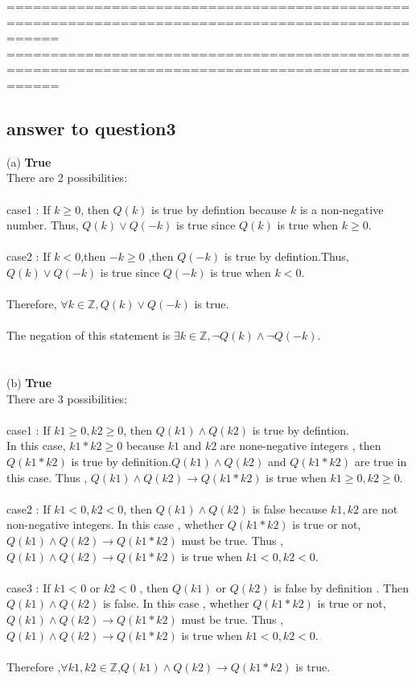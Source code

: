 \documentclass[12pt,a4paper]{article}
\begin{document}
==================================================================================================
\newpage
==================================================================================================

\subsection*{answer to question3}

(a) \textbf{True}\\
There are 2 possibilities:\\\\
case1  :  If $k \geq 0$, then $Q(k)$ is true by defintion because $k$ is a non-negative number. Thus,  $Q(k) \lor Q(-k)$ is true since $Q(k)$ is true when $k \geq 0$.\\\\
case2  :  If $k < 0$,then $-k \geq 0$ ,then $Q(-k)$ is true by defintion.Thus,  $Q(k) \lor Q(-k)$ is true since $Q(-k)$ is true when $k < 0$.\\\\
Therefore, $\forall k \in \mathbb{Z},Q(k) \lor Q(-k)$ is true.\\\\
The negation of this statement is $\exists k \in \mathbb{Z},\neg Q(k) \land \neg Q(-k)$.\\\\\\
(b) \textbf{True}\\
There are 3 possibilities:\\\\
case1  :  If $k1 \geq 0 ,  k2 \geq 0$, then $Q(k1) \land Q(k2)$ is true by defintion.\\
In this case, $k1 * k2 \geq 0$ because $k1$ and $k2$ are none-negative integers ,  then $Q(k1 * k2)$ is true by definition.$Q(k1) \land Q(k2)$ and $Q(k1 * k2)$ are true in this case. Thus ,  $Q(k1) \land Q(k2) \rightarrow Q(k1 * k2)$ is true when $k1 \geq 0 ,  k2 \geq 0$.\\\\
case2 : If $k1 < 0,k2 < 0$, then $Q(k1) \land Q(k2)$ is false because $k1,k2$ are not non-negative integers. In this case , whether $Q(k1 * k2)$ is true or not,  $Q(k1) \land Q(k2) \rightarrow Q(k1 * k2)$ must be true. Thus ,  $Q(k1) \land Q(k2) \rightarrow Q(k1 * k2)$ is true when $k1 < 0 ,  k2 < 0$.\\\\
case3 : If $k1 < 0$ or $k2 < 0$ , then $Q(k1)$ or $Q(k2)$ is false by definition . Then $Q(k1) \land Q(k2)$ is false. In this case , whether $Q(k1 * k2)$ is true or not,  $Q(k1) \land Q(k2) \rightarrow Q(k1 * k2)$ must be true. Thus ,  $Q(k1) \land Q(k2) \rightarrow Q(k1 * k2)$ is true when $k1 < 0 ,  k2 < 0$.\\\\
Therefore ,$\forall k1,k2 \in \mathbb{Z}$,$Q(k1) \land Q(k2) \rightarrow Q(k1 * k2)$ is true.
\end{document}
